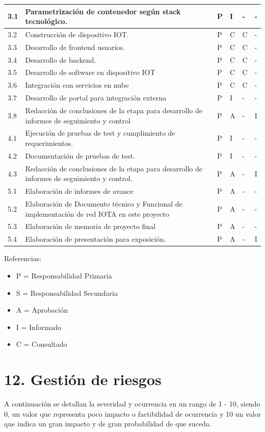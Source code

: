 \documentclass[11pt]{charter}
\begin{document}
\begin{longtable}{|m{1cm}|m{3.5cm}|m{2.2cm}|m{2cm}|m{3cm}|m{1.5cm}|}
3.1 & Parametrización de contenedor según stack tecnológico. & P & I & - & -\\ \hline
3.2 & Construcción de dispositivo IOT. & P & C & C & -\\ \hline
3.3 & Desarrollo de frontend usuarios. & P & C & C & -\\ \hline
3.4 & Desarrollo de backend. & P & C & C & -\\ \hline
3.5 & Desarrollo de software en dispositivo IOT & P & C & C & -\\ \hline
3.6 & Integración con servicios en nube & P & C & C & -\\ \hline
3.7 & Desarrollo de portal para integración externa & P & I & - & -\\ \hline
3.8 & Redacción de conclusiones de la etapa para desarrollo de informes de seguimiento y control & P & A & - & I\\ \hline
4.1 & Ejecución de pruebas de test y cumplimiento de requerimientos. & P & I & - & -\\ \hline
4.2 & Documentación de pruebas de test. & P & I & - & -\\ \hline
4.3 & Redacción de conclusiones de la etapa para desarrollo de informes de seguimiento y control. & P & A & - & I\\ \hline
5.1 & Elaboración de informes de avance & P & A & - & -\\ \hline
5.2 & Elaboración de Documento técnico y Funcional de implementación de red IOTA en este proyecto & P & A & - & -\\ \hline
5.3 & Elaboración de memoria de proyecto final & P & A & - & -\\ \hline
5.4 & Elaboración de presentación para exposición. & P & A & - & I\\ \hline
\end{longtable}


{\footnotesize
Referencias:
\begin{itemize}
	\item P = Responsabilidad Primaria
	\item S = Responsabilidad Secundaria
	\item A = Aprobación
	\item I = Informado
	\item C = Consultado
\end{itemize}
} %


\section{12. Gestión de riesgos}
\label{sec:riesgos}
A continuación se detallan la severidad y ocurrencia en un rango de 1 - 10, siendo 0, un valor que representa poco impacto o factibilidad de ocurrencia y 10 un valor que indica un gran impacto y de gran probabilidad de que suceda. 
\end{document}
